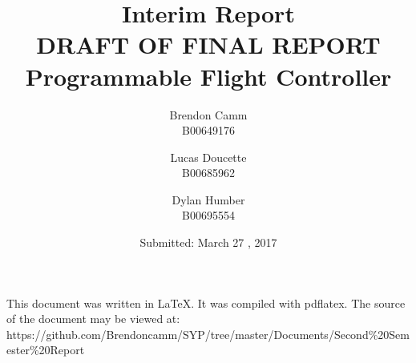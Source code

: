 \documentclass[12pt,letterpaper,titlepage]{article}
\title{Interim Report \\ \small DRAFT OF FINAL REPORT \\ Programmable Flight Controller}
\author{Brendon Camm \\ B00649176 \and Lucas Doucette \\ B00685962 \and Dylan Humber \\ B00695554}
\date{Submitted: March 27 , 2017}
\begin{document}
	\maketitle
	\newpage
	\vspace*{2in}
	This document was written in \LaTeX.  It was compiled with pdflatex.  The source of the document may be viewed at: \newline\small	https://github.com/Brendoncamm/SYP/tree/master/Documents/Second\%20Semester\%20Report
	\vspace*{4in}
	\pagebreak
	
	
	
	\setcounter{tocdepth}{2}
	\setcounter{tocdepth}{3}
	\tableofcontents
	\pagebreak
	
	
	
	
	
	
	
	
	\pagebreak
	
\end{document}

